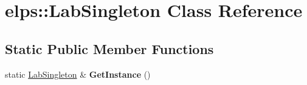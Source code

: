 \hypertarget{classelps_1_1_lab_singleton}{\section{elps\+:\+:Lab\+Singleton Class Reference}
\label{classelps_1_1_lab_singleton}
}
\subsection*{Static Public Member Functions}
\begin{DoxyCompactItemize}
\item 
\hypertarget{classelps_1_1_lab_singleton_a14e209f9848c6747f6169d0359b58785}{static \hyperlink{classelps_1_1_lab_singleton}{Lab\+Singleton} \& {\bfseries Get\+Instance} ()}\label{classelps_1_1_lab_singleton_a14e209f9848c6747f6169d0359b58785}

\end{DoxyCompactItemize}
